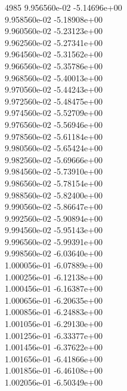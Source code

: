 4985	9.956560e-02	-5.14696e+00	\\ 	9.958560e-02	-5.18908e+00	\\ 	9.960560e-02	-5.23123e+00	\\ 	9.962560e-02	-5.27341e+00	\\ 	9.964560e-02	-5.31562e+00	\\ 	9.966560e-02	-5.35786e+00	\\ 	9.968560e-02	-5.40013e+00	\\ 	9.970560e-02	-5.44243e+00	\\ 	9.972560e-02	-5.48475e+00	\\ 	9.974560e-02	-5.52709e+00	\\ 	9.976560e-02	-5.56946e+00	\\ 	9.978560e-02	-5.61184e+00	\\ 	9.980560e-02	-5.65424e+00	\\ 	9.982560e-02	-5.69666e+00	\\ 	9.984560e-02	-5.73910e+00	\\ 	9.986560e-02	-5.78154e+00	\\ 	9.988560e-02	-5.82400e+00	\\ 	9.990560e-02	-5.86647e+00	\\ 	9.992560e-02	-5.90894e+00	\\ 	9.994560e-02	-5.95143e+00	\\ 	9.996560e-02	-5.99391e+00	\\ 	9.998560e-02	-6.03640e+00	\\ 	1.000056e-01	-6.07889e+00	\\ 	1.000256e-01	-6.12138e+00	\\ 	1.000456e-01	-6.16387e+00	\\ 	1.000656e-01	-6.20635e+00	\\ 	1.000856e-01	-6.24883e+00	\\ 	1.001056e-01	-6.29130e+00	\\ 	1.001256e-01	-6.33377e+00	\\ 	1.001456e-01	-6.37622e+00	\\ 	1.001656e-01	-6.41866e+00	\\ 	1.001856e-01	-6.46108e+00	\\ 	1.002056e-01	-6.50349e+00	\\ \hline
